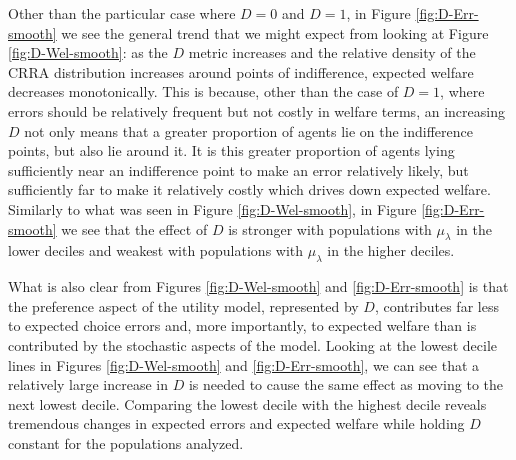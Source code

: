 \documentclass[../main.tex]{subfiles}
\begin{document}
\addtocounter{footnote}{-1}

Other than the particular case where $D=0$ and $D=1$, in Figure \ref{fig:D-Err-smooth} we see the general trend that we might expect from looking at Figure \ref{fig:D-Wel-smooth}: as the $D$ metric increases and the relative density of the CRRA distribution increases around points of indifference, expected welfare decreases monotonically.
This is because, other than the case of $D=1$, where errors should be relatively frequent but not costly in welfare terms, an increasing $D$ not only means that a greater proportion of agents lie on the indifference points, but also lie around it.
It is this greater proportion of agents lying sufficiently near an indifference point to make an error relatively likely, but sufficiently far to make it relatively costly which drives down expected welfare.
Similarly to what was seen in Figure \ref{fig:D-Wel-smooth}, in Figure \ref{fig:D-Err-smooth} we see that the effect of $D$ is stronger with populations with $\mu_\lambda$ in the lower deciles and weakest with populations with $\mu_\lambda$ in the higher deciles.

What is also clear from Figures \ref{fig:D-Wel-smooth} and \ref{fig:D-Err-smooth} is that the preference aspect of the utility model, represented by $D$, contributes far less to expected choice errors and, more importantly, to expected welfare than is contributed by the stochastic aspects of the model.
Looking at the lowest decile lines in Figures \ref{fig:D-Wel-smooth} and \ref{fig:D-Err-smooth}, we can see that a relatively large increase in $D$ is needed to cause the same effect as moving to the next lowest decile.
Comparing the lowest decile with the highest decile reveals tremendous changes in expected errors and expected welfare while holding $D$ constant for the populations analyzed.
\end{document}
